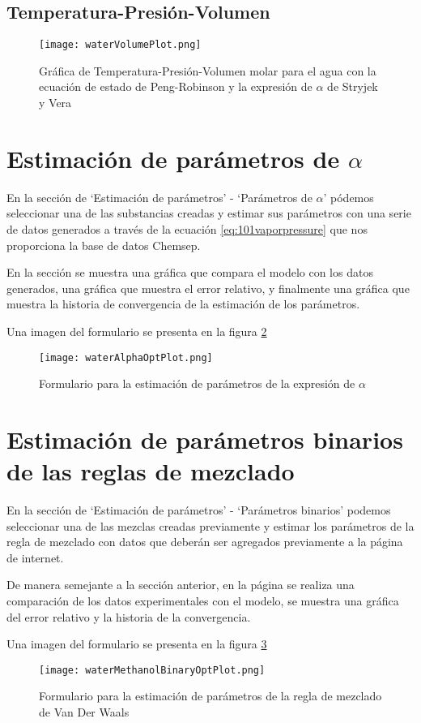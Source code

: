 	\subsection{Temperatura-Presión-Volumen}\label{subsec:tpv}
		\begin{figure}[H]
			\texttt{[image: waterVolumePlot.png]}
			\caption{Gráfica de Temperatura-Presión-Volumen molar para el agua con la ecuación de estado de Peng-Robinson y la expresión de $\alpha$ de Stryjek y Vera}
			\label{vplot}
		\end{figure}
	
	
\section{Estimación de parámetros de $\alpha$}\label{sec:webAlphaOptim}
	En la sección de `Estimación de parámetros' - `Parámetros de $\alpha$' pódemos seleccionar una de las substancias creadas y estimar sus parámetros con una serie de datos generados a través de la ecuación \ref{eq:101vaporpressure} que nos proporciona la base de datos Chemsep.

	En la sección se muestra una gráfica que compara el modelo con los datos generados, una gráfica que muestra el error relativo, y finalmente una gráfica que muestra la historia de convergencia de la estimación de los parámetros.

	Una imagen del formulario se presenta en la figura \ref{fig:alphaOptim}

\begin{figure}[H]
	\texttt{[image: waterAlphaOptPlot.png]}
	\caption{Formulario para la estimación de parámetros de la expresión de $\alpha$}
	\label{fig:alphaOptim}
\end{figure}


\section{Estimación de parámetros binarios de las reglas de mezclado}\label{sec:webBinaryOptim}
	En la sección de `Estimación de parámetros' - `Parámetros binarios' podemos seleccionar una de las mezclas creadas previamente y estimar los parámetros de la regla de mezclado con datos que deberán ser agregados previamente a la página de internet.

	De manera semejante a la sección anterior, en la página se realiza una comparación de los datos experimentales con el modelo, se muestra una gráfica del error relativo y la historia de la convergencia.

	Una imagen del formulario se presenta en la figura \ref{fig:binaryOptim}
\begin{figure}[H]
	\texttt{[image: waterMethanolBinaryOptPlot.png]}
	\caption{Formulario para la estimación de parámetros de la regla de mezclado de Van Der Waals}
	\label{fig:binaryOptim}
\end{figure}
